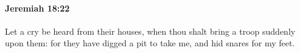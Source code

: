 
		\paragraph{Jeremiah 18:22} %
			\label{JEREMIAH-18-22}

			Let a cry be heard from their houses, when thou shalt bring a troop suddenly upon them: for they have digged a pit to take me, and hid snares for my feet.


